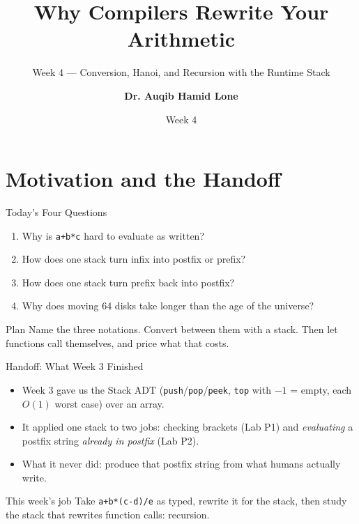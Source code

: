 \documentclass[aspectratio=169]{beamer}
\title{Why Compilers Rewrite Your Arithmetic}
\subtitle{Week 4 --- Conversion, Hanoi, and Recursion with the Runtime Stack}
\author[Dr. Auqib Hamid Lone]{\textbf{Dr. Auqib Hamid Lone}}
\institute[GCET Ganderbal]{PCC CS-301: Data Structures\\GCET, Ganderbal}
\date[Week 4]{\small Week 4}
\begin{document}
\frame{\titlepage}

\section{Motivation and the Handoff}

\begin{frame}{Today's Four Questions}
  \begin{enumerate}
    \item Why is \texttt{a+b*c} hard to evaluate as written?
    \item How does one stack turn infix into postfix or prefix?
    \item How does one stack turn prefix back into postfix?
    \item Why does moving 64 disks take longer than the age of the universe?
  \end{enumerate}
  \vspace{0.2cm}
  \begin{exampleblock}{Plan}
    Name the three notations. Convert between them with a stack. Then let
    functions call themselves, and price what that costs.
  \end{exampleblock}
\end{frame}

\begin{frame}{Handoff: What Week 3 Finished}
  \begin{itemize}
    \item Week 3 gave us the Stack ADT (\texttt{push}/\texttt{pop}/\texttt{peek},
      \texttt{top} with $-1$ = empty, each $O(1)$ worst case) over an array.
    \item It applied one stack to two jobs: checking brackets (Lab P1) and
      \emph{evaluating} a postfix string \emph{already in postfix} (Lab P2).
    \item What it never did: produce that postfix string from what humans
      actually write.
  \end{itemize}
  \begin{exampleblock}{This week's job}
    Take \texttt{a+b*(c-d)/e} as typed, rewrite it for the stack, then study
    the stack that rewrites function calls: recursion.
  \end{exampleblock}
\end{frame}
\end{document}
